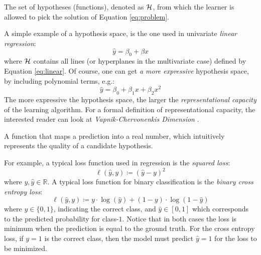 \begin{definition}
	The set of hypotheses (functions), denoted as $\mathcal{H}$, from which the
	learner is allowed to pick the solution of Equation \ref{eq:problem}.
\end{definition}

A simple example of a hypothesis space, is the one used in univariate
\emph{linear regression}:
\begin{equation}
	\label{eq:linear}
	\hat{y} = \beta_0 + \beta x
\end{equation}
where $\mathcal{H}$ contains all lines (or hyperplanes in the multivariate case)
defined by Equation \ref{eq:linear}. Of course, one can get \emph{a
more expressive} hypothesis space, by including polynomial terms, e.g.:
\begin{equation}
	\label{eq:polynomial}
	\hat{y} = \beta_0 + \beta_1 x + \beta_2 x^2
\end{equation}
The more expressive the hypothesis space, the larger the \emph{representational
capacity} of the learning algorithm. For a
formal definition of representational capacity, the interested reader can look
at \emph{Vapnik-Chervonenkis Dimension}
\parencite{statlearn}.

\begin{definition}
	A function that maps a prediction into a real number, which intuitively
	represents the quality of a candidate hypothesis.
\end{definition}

For example, a typical loss function used in regression is the \emph{squared
loss}:
\begin{equation}
	\label{eq:squared_loss}
	\ell(\hat{y}, y) \coloneqq (\hat{y} - y)^2
\end{equation}
where $y, \hat{y} \in \mathbb{R}$. A typical loss function for binary
classification is the \emph{binary cross entropy
loss}:
\begin{equation}
	\label{eq:cross_entropy}
	\ell(\hat{y}, y) \coloneqq y \cdot \log (\hat{y})
	+ (1 - y) \cdot \log (1 - \hat{y})
\end{equation}
where $y \in \{0, 1\}$, indicating the correct class, and $\hat{y} \in [0, 1]$
which corresponds to the predicted probability for class-$1$. Notice that in
both cases the loss is minimum when the prediction is equal to the ground truth.
For the cross entropy loss, if $y=1$ is the correct class, then the model must
predict $\hat{y}=1$ for the loss to be minimized.

